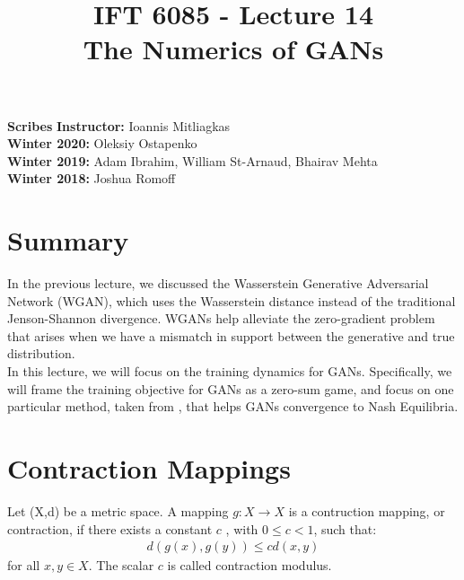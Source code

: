 \documentclass{article}
\title{IFT 6085 - Lecture 14 \\ 
The Numerics of GANs }
\date{}
\begin{document}
 

\maketitle


    \vspace{0.2in}


    \textbf{Scribes}\hfill
    \textbf{Instructor:}  Ioannis Mitliagkas\\
    \textbf{Winter 2020:} Oleksiy Ostapenko\\
    \textbf{Winter 2019:} Adam Ibrahim, William St-Arnaud, Bhairav Mehta\\
    \textbf{Winter 2018:} Joshua Romoff\\





\newcommand{\infgc}{\inf_{g \in \mathcal{C}}}
\newcommand{\supgc}{\sup_{g \in \mathcal{C}}}

\newcommand{\Prob}{\mathbb{P}}
\newcommand{\E}{\mathbb{E}}
\newcommand{\reals}{\mathbb{R}}





\section{Summary}

In the previous lecture, we discussed the Wasserstein Generative Adversarial Network (WGAN), which uses the Wasserstein distance instead of the traditional Jenson-Shannon divergence. WGANs help alleviate the zero-gradient problem that arises when we have a mismatch in support between the generative and true distribution.
\\

In this lecture, we will focus on the training dynamics for GANs. Specifically, we will frame the training objective for GANs as a zero-sum game, and focus on one particular method, taken from \cite{MeschederNG17a}, that helps GANs convergence to Nash Equilibria. 

\section{Contraction Mappings}

\begin{defn}\label{def:contraction mapping}
    Let (X,d) be a metric space. A mapping $g:X \rightarrow X$ is a contruction mapping, or contraction, if there exists a constant $c$ , with $0\leq c < 1$, such that:
    \begin{align}
        d(g(x),g(y)) \leq cd(x,y)
    \end{align}
    for all $x,y \in X$. The scalar $c$ is called contraction modulus.
\end{defn}
\end{document}
